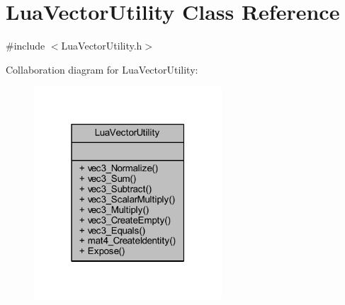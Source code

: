 \hypertarget{class_lua_vector_utility}{}\section{Lua\+Vector\+Utility Class Reference}
\label{class_lua_vector_utility}


{\ttfamily \#include $<$Lua\+Vector\+Utility.\+h$>$}



Collaboration diagram for Lua\+Vector\+Utility\+:\nopagebreak
\begin{figure}[H]
\begin{center}
\leavevmode
\includegraphics[width=199pt]{class_lua_vector_utility__coll__graph}
\end{center}
\end{figure}
